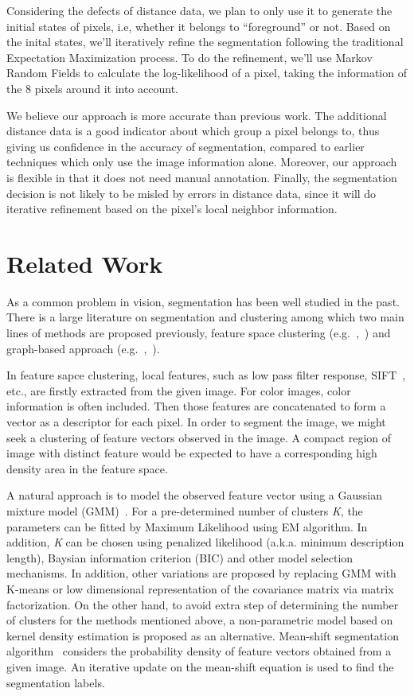 \documentclass{article} %
\begin{document}
Considering the defects of distance data, we plan to only use it to
generate the initial states of pixels, i.e,
 whether it belongs to ``foreground'' or not. Based on the inital
 states, we'll iteratively refine the segmentation following the
 traditional Expectation Maximization process. To do the refinement,
 we'll use Markov Random Fields to calculate the log-likelihood of a
 pixel, taking the information of the 8 pixels around it into account.

We believe our approach is more accurate than previous work. The additional 
distance data is a good indicator about which group a pixel belongs to, 
thus giving us confidence in the accuracy of segmentation, compared to earlier
 techniques which only use the image information alone. Moreover, our
 approach is flexible in that it does not need manual annotation. Finally, the
segmentation decision is not likely to be misled by errors in distance
data, since it will do iterative refinement based on the pixel's local
neighbor information.

\section{Related Work}
As a common problem in vision, segmentation has been well studied in the past. There is a large literature on segmentation and clustering among which two main lines of methods are proposed previously, feature space clustering (e.g.~\citep{Comaniciu1997featurespace},~\citep{Comaniciu1999meanshift}) and graph-based approach (e.g.~\citep{Shi1997normalizedcuts},~\citep{Wu1993optimalgraph}). 

In feature sapce clustering, local features, such as low pass filter response, SIFT~\citep{Lowe2004sift}, etc., are firstly extracted from the given image. For color images, color information is often included. Then those features are concatenated to form a vector as a descriptor for each pixel. In order to segment the image, we might seek a clustering of feature vectors observed in the image. A compact region of image with distinct feature would be expected to have a corresponding high density area in the feature space. 

A natural approach is to model the observed feature vector using a Gaussian mixture model (GMM)~\citep{Carson2002bolbworld}. For a pre-determined number of clusters \textit{K}, the parameters can be fitted by Maximum Likelihood using EM algorithm. In addition, \textit{K} can be chosen using penalized likelihood (a.k.a. minimum description length), Baysian information criterion (BIC) and other model selection mechanisms. In addition, other variations are proposed by replacing GMM with K-means or low dimensional representation of the covariance matrix via matrix factorization. On the other hand, to avoid extra step of determining the number of clusters for the methods mentioned above, a non-parametric model based on kernel density estimation is proposed as an alternative. Mean-shift segmentation algorithm~\citep{Comaniciu2002robustapproach} considers the probability density of feature vectors obtained from a given image. An iterative update on the mean-shift equation is used to find the segmentation labels. 
\end{document}
